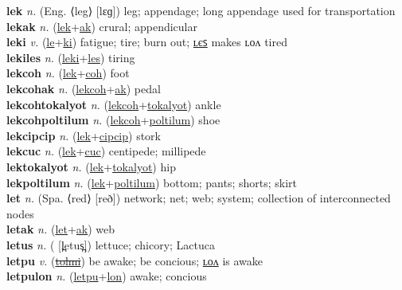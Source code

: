 \textbf{lek} \textit{n.} (Eng. ⟨leg⟩ [lɛɡ])
leg; appendage; long appendage used for transportation \label{lek} \\
\textbf{lekak} \textit{n.} (\hyperref[lek]{lek}+\hyperref[ak]{ak})
crural; appendicular \label{lekak} \\
\textbf{leki} \textit{v.} (\hyperref[le]{le}+\hyperref[ki]{ki})
fatigue; tire; burn out; \hyperref[lekiles]{ʟєꜱ} makes ʟᴏᴧ tired \label{leki} \\
\textbf{lekiles} \textit{n.} (\hyperref[leki]{leki}+\hyperref[les]{les})
tiring \label{lekiles} \\
\textbf{lekcoh} \textit{n.} (\hyperref[lek]{lek}+\hyperref[coh]{coh})
foot \label{lekcoh} \\
\textbf{lekcohak} \textit{n.} (\hyperref[lekcoh]{lekcoh}+\hyperref[ak]{ak})
pedal \label{lekcohak} \\
\textbf{lekcohtokalyot} \textit{n.} (\hyperref[lekcoh]{lekcoh}+\hyperref[tokalyot]{tokalyot})
ankle \label{lekcohtokalyot} \\
\textbf{lekcohpoltilum} \textit{n.} (\hyperref[lekcoh]{lekcoh}+\hyperref[poltilum]{poltilum})
shoe \label{lekcohpoltilum} \\
\textbf{lekcipcip} \textit{n.} (\hyperref[lek]{lek}+\hyperref[cipcip]{cipcip})
stork \label{lekcipcip} \\
\textbf{lekcuc} \textit{n.} (\hyperref[lek]{lek}+\hyperref[cuc]{cuc})
centipede; millipede \label{lekcuc} \\
\textbf{lektokalyot} \textit{n.} (\hyperref[lek]{lek}+\hyperref[tokalyot]{tokalyot})
hip \label{lektokalyot} \\
\textbf{lekpoltilum} \textit{n.} (\hyperref[lek]{lek}+\hyperref[poltilum]{poltilum})
bottom; pants; shorts; skirt \label{lekpoltilum} \\
\textbf{let} \textit{n.} (Spa. ⟨red⟩ [reð])
network; net; web; system; collection of interconnected nodes \label{let} \\
\textbf{letak} \textit{n.} (\hyperref[let]{let}+\hyperref[ak]{ak})
web \label{letak} \\
\textbf{letus} \textit{n.} ( [l̪etus̪])
lettuce; chicory; Lactuca \label{letus} \\
\textbf{letpu} \textit{v.} (\hyperref[tolmi]{\sout{tolmi}})
be awake; be concious; \hyperref[letpulon]{ʟᴏᴧ} is awake \label{letpu} \\
\textbf{letpulon} \textit{n.} (\hyperref[letpu]{letpu}+\hyperref[lon]{lon})
awake; concious \label{letpulon} \\
